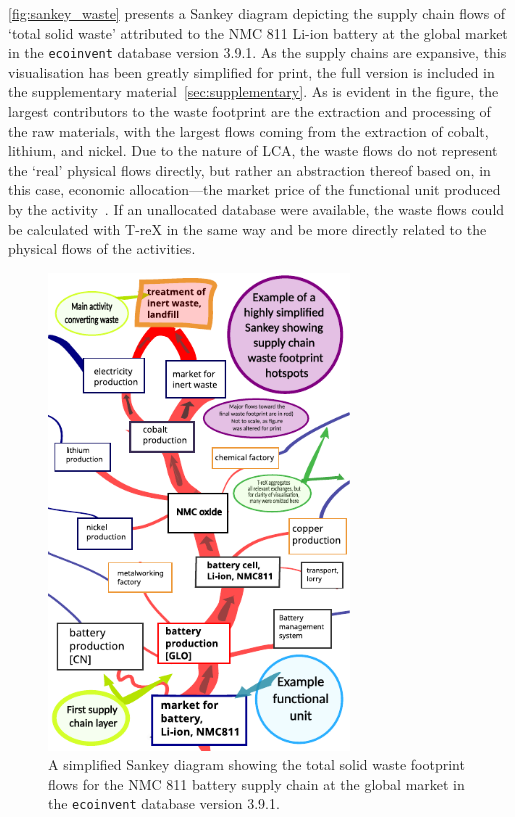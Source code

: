 \documentclass[a4paper,fleqn]{cas-dc}
\begin{document}
\autoref{fig:sankey_waste} presents a Sankey diagram depicting the supply chain flows of `total solid waste' attributed to the NMC 811 Li-ion battery at the global market in the \texttt{ecoinvent} database version 3.9.1. As the supply chains are expansive, this visualisation has been greatly simplified for print, the full version is included in the supplementary material~\autoref{sec:supplementary}. As is evident in the figure, the largest contributors to the waste footprint are the extraction and processing of the raw materials, with the largest flows coming from the extraction of cobalt, lithium, and nickel. Due to the nature of LCA, the waste flows do not represent the `real' physical flows directly, but rather an abstraction thereof based on, in this case, economic allocation---the market price of the functional unit produced by the activity~\citep{guinee2004economicallocation}. If an unallocated database were available, the waste flows could be calculated with T-reX in the same way and be more directly related to the physical flows of the activities.

\begin{figure}[htbp]
	\centering
	\includegraphics[width=8cm]{figs/T-reX_NMC811_WasteTotalSolid.pdf}
	\caption{A simplified Sankey diagram showing the total solid waste footprint flows for the NMC 811 battery supply chain at the global market in the \texttt{ecoinvent} database version 3.9.1.}\label{fig:sankey_waste}
\end{figure}
\end{document}
